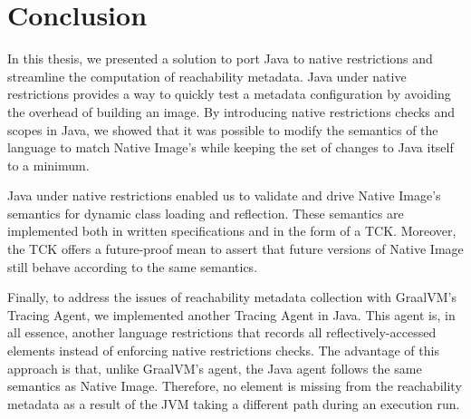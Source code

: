 \chapter{Conclusion}
% 

In this thesis, we presented a solution to port Java to native restrictions and streamline the computation of reachability metadata. 
Java under native restrictions provides a way to quickly test a metadata configuration by avoiding the overhead of building an image.
By introducing native restrictions checks and scopes in Java, we showed that it was possible to modify the semantics of the language to match Native Image's while keeping the set of changes to Java itself to a minimum.

Java under native restrictions enabled us to validate and drive Native Image's semantics for dynamic class loading and reflection. These semantics are implemented both in written specifications and in the form of a TCK. Moreover, the TCK offers a future-proof mean to assert that future versions of Native Image still behave according to the same semantics. 

Finally, to address the issues of reachability metadata collection with GraalVM's Tracing Agent, we implemented another Tracing Agent in Java. This agent is, in all essence, another language restrictions that records all reflectively-accessed elements instead of enforcing native restrictions checks. The advantage of this approach is that, unlike GraalVM's agent, the Java agent follows the same semantics as Native Image. Therefore, no element is missing from the reachability metadata as a result of the JVM taking a different path during an execution run. 

